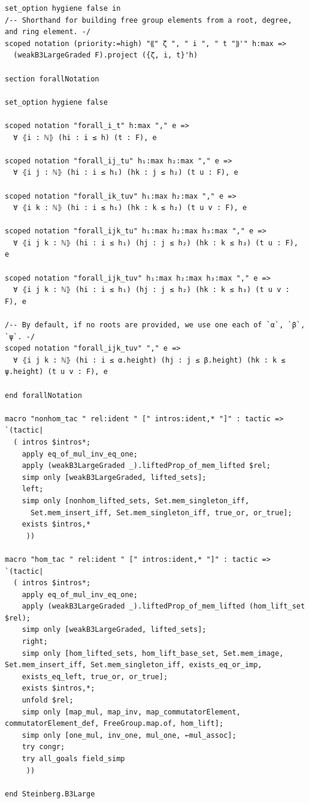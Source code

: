 \documentclass[10pt,a4paper]{article}
\begin{document}
\begin{Verbatim}
set_option hygiene false in
/-- Shorthand for building free group elements from a root, degree, and ring element. -/
scoped notation (priority:=high) "⸨" ζ ", " i ", " t "⸩'" h:max =>
  (weakB3LargeGraded F).project ({ζ, i, t}'h)

section forallNotation

set_option hygiene false

scoped notation "forall_i_t" h:max "," e =>
  ∀ ⦃i : ℕ⦄ (hi : i ≤ h) (t : F), e

scoped notation "forall_ij_tu" h₁:max h₂:max "," e =>
  ∀ ⦃i j : ℕ⦄ (hi : i ≤ h₁) (hk : j ≤ h₂) (t u : F), e

scoped notation "forall_ik_tuv" h₁:max h₂:max "," e =>
  ∀ ⦃i k : ℕ⦄ (hi : i ≤ h₁) (hk : k ≤ h₂) (t u v : F), e

scoped notation "forall_ijk_tu" h₁:max h₂:max h₃:max "," e =>
  ∀ ⦃i j k : ℕ⦄ (hi : i ≤ h₁) (hj : j ≤ h₂) (hk : k ≤ h₃) (t u : F), e

scoped notation "forall_ijk_tuv" h₁:max h₂:max h₃:max "," e =>
  ∀ ⦃i j k : ℕ⦄ (hi : i ≤ h₁) (hj : j ≤ h₂) (hk : k ≤ h₃) (t u v : F), e

/-- By default, if no roots are provided, we use one each of `α`, `β`, `ψ`. -/
scoped notation "forall_ijk_tuv" "," e =>
  ∀ ⦃i j k : ℕ⦄ (hi : i ≤ α.height) (hj : j ≤ β.height) (hk : k ≤ ψ.height) (t u v : F), e

end forallNotation

macro "nonhom_tac " rel:ident " [" intros:ident,* "]" : tactic => `(tactic|
  ( intros $intros*;
    apply eq_of_mul_inv_eq_one;
    apply (weakB3LargeGraded _).liftedProp_of_mem_lifted $rel;
    simp only [weakB3LargeGraded, lifted_sets];
    left;
    simp only [nonhom_lifted_sets, Set.mem_singleton_iff,
      Set.mem_insert_iff, Set.mem_singleton_iff, true_or, or_true];
    exists $intros,*
     ))

macro "hom_tac " rel:ident " [" intros:ident,* "]" : tactic => `(tactic|
  ( intros $intros*;
    apply eq_of_mul_inv_eq_one;
    apply (weakB3LargeGraded _).liftedProp_of_mem_lifted (hom_lift_set $rel);
    simp only [weakB3LargeGraded, lifted_sets];
    right;
    simp only [hom_lifted_sets, hom_lift_base_set, Set.mem_image, Set.mem_insert_iff, Set.mem_singleton_iff, exists_eq_or_imp,
    exists_eq_left, true_or, or_true];
    exists $intros,*;
    unfold $rel;
    simp only [map_mul, map_inv, map_commutatorElement, commutatorElement_def, FreeGroup.map.of, hom_lift];
    simp only [one_mul, inv_one, mul_one, ←mul_assoc];
    try congr;
    try all_goals field_simp
     ))

end Steinberg.B3Large
\end{Verbatim}
\end{document}
